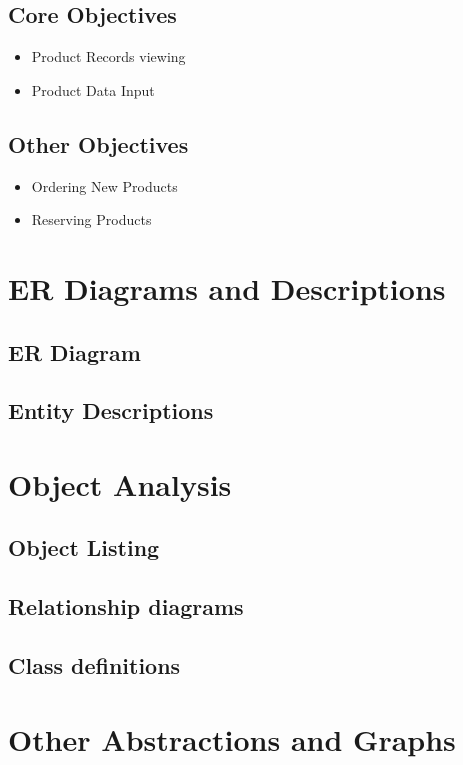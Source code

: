 \subsection{Core Objectives}
\begin{itemize}
	\item Product Records viewing
	\item Product Data Input
\end{itemize}
\subsection{Other Objectives}
\begin{itemize}
	\item Ordering New Products
	\item Reserving Products
\end{itemize}
\section{ER Diagrams and Descriptions}

\subsection{ER Diagram}

\subsection{Entity Descriptions}

\section{Object Analysis}

\subsection{Object Listing}

\subsection{Relationship diagrams}

\subsection{Class definitions}

\section{Other Abstractions and Graphs}

